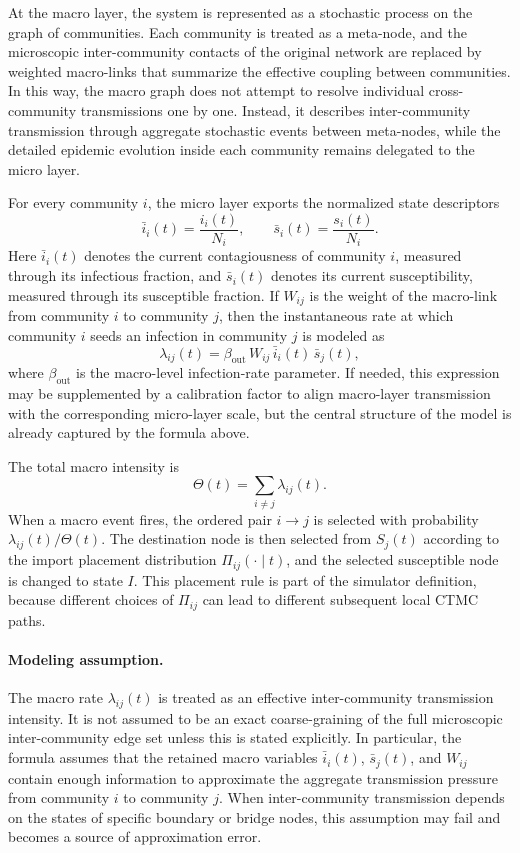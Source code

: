 \documentclass[12pt,a4paper]{article}
\begin{document}
At the macro layer, the system is represented as a stochastic process on the graph of communities. Each community is treated as a meta-node, and the microscopic inter-community contacts of the original network are replaced by weighted macro-links that summarize the effective coupling between communities. In this way, the macro graph does not attempt to resolve individual cross-community transmissions one by one. Instead, it describes inter-community transmission through aggregate stochastic events between meta-nodes, while the detailed epidemic evolution inside each community remains delegated to the micro layer.

For every community \(i\), the micro layer exports the normalized state descriptors
\[
\bar{i}_i(t)=\frac{i_i(t)}{N_i},
\qquad
\bar{s}_i(t)=\frac{s_i(t)}{N_i}.
\]
Here \(\bar{i}_i(t)\) denotes the current contagiousness of community \(i\), measured through its infectious fraction, and \(\bar{s}_i(t)\) denotes its current susceptibility, measured through its susceptible fraction. If \(W_{ij}\) is the weight of the macro-link from community \(i\) to community \(j\), then the instantaneous rate at which community \(i\) seeds an infection in community \(j\) is modeled as
\[
\lambda_{ij}(t)
=\beta_{\mathrm{out}}\,W_{ij}\,\bar{i}_i(t)\,\bar{s}_j(t),
\]
where \(\beta_{\mathrm{out}}\) is the macro-level infection-rate parameter. If needed, this expression may be supplemented by a calibration factor to align macro-layer transmission with the corresponding micro-layer scale, but the central structure of the model is already captured by the formula above. 

The total macro intensity is
\[
\Theta(t)=\sum_{i\neq j}\lambda_{ij}(t).
\]
When a macro event fires, the ordered pair \(i\to j\) is selected with probability \(\lambda_{ij}(t)/\Theta(t)\). The destination node is then selected from \(S_j(t)\) according to the import placement distribution \(\Pi_{ij}(\cdot\mid t)\), and the selected susceptible node is changed to state \(I\). This placement rule is part of the simulator definition, because different choices of \(\Pi_{ij}\) can lead to different subsequent local CTMC paths.

\paragraph{Modeling assumption.}
The macro rate \(\lambda_{ij}(t)\) is treated as an effective inter-community transmission intensity. 
It is not assumed to be an exact coarse-graining of the full microscopic inter-community edge set unless this is stated explicitly. 
In particular, the formula assumes that the retained macro variables \(\bar{i}_i(t)\), \(\bar{s}_j(t)\), and \(W_{ij}\) contain enough information to approximate the aggregate transmission pressure from community \(i\) to community \(j\). 
When inter-community transmission depends on the states of specific boundary or bridge nodes, this assumption may fail and becomes a source of approximation error.
\end{document}
